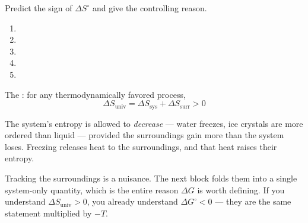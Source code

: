 \documentclass{apchem-notes}
\begin{document}

Predict the sign of $\Delta S^\circ$ and give the controlling reason.

\begin{enumerate}[leftmargin=*,itemsep=0.4em]
  \item {} 
  \item {} 
  \item {}
  \item {}
  \item {}
\end{enumerate}



The : for any thermodynamically favored
process,
\[ \Delta S_{\text{univ}} = \Delta S_{\text{sys}} + \Delta S_{\text{surr}}
   > 0 \]

The system's entropy is allowed to \emph{decrease} --- water freezes, ice
crystals are more ordered than liquid --- provided the surroundings gain
more than the system loses. Freezing releases heat to the surroundings, and
that heat raises their entropy.

\begin{apcnote}
Tracking the surroundings is a nuisance. The next block folds them into a
single system-only quantity, which is the entire reason $\Delta G$ is worth
defining. If you understand $\Delta S_{\text{univ}} > 0$, you already
understand $\Delta G^\circ < 0$ --- they are the same statement multiplied
by $-T$.
\end{apcnote}

\end{document}
